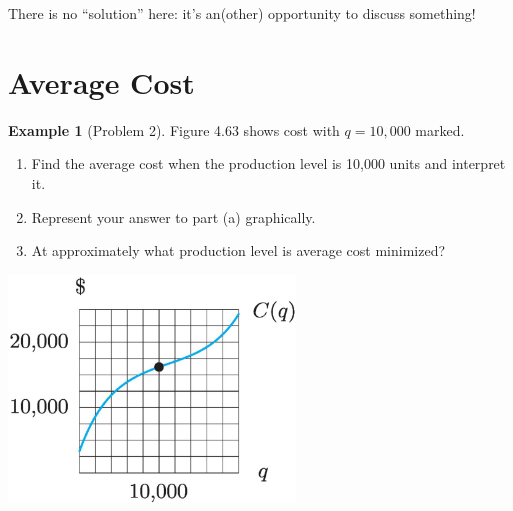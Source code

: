 \documentclass[oneside]{book}
\theoremstyle{definition}
\newtheorem{example}{Example}
\theoremstyle{solution}
\newtheorem*{solution}{Solution}
\newenvironment{solution}{\vspace{2in}\comment}{\endcomment}
\begin{document}
\begin{solution}
  There is no ``solution'' here: it's an(other) opportunity to discuss
  something!
\end{solution}


\section{Average Cost}

\begin{example}[Problem 2]
  Figure 4.63 shows cost with $q = 10,000$ marked.
  \begin{enumerate}
  \item Find the average cost when the production level is 10,000
    units and interpret it.
  \item Represent your answer to part (a) graphically.
  \item At approximately what production level is average cost
    minimized?
  \end{enumerate}
  
\begin{center}
  \includegraphics[width=3in]{Images/s4-5prob2}
\end{center}
\end{example}
\end{document}
